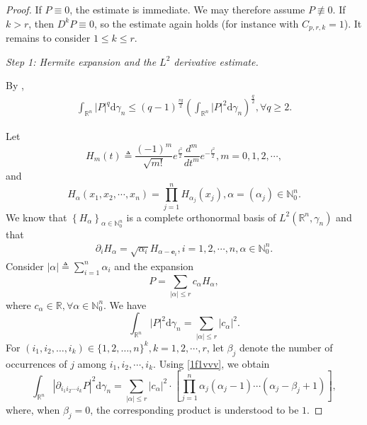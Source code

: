 \documentclass[12pt]{article}
\theoremstyle{plain}
\theoremstyle{definition}
\theoremstyle{remark}
\numberwithin{equation}{section}
\begin{document}
\begin{proof}
If $P\equiv0$, the estimate is immediate.  We may therefore assume $P\not\equiv0$.  If $k>r$, then $D^kP\equiv0$, so the estimate again holds (for instance with $C_{p,r,k}=1$).  It remains to consider $1\leqslant k\leqslant r$.

\medskip\noindent\textit{Step 1: Hermite expansion and the $L^2$ derivative estimate.}

By \cite[Proposition~5.48, p.~135]{AS17},
\begin{eqnarray}
	\int_{\mathbb{R}^{n}} \left| P \right|^{q} \mathrm{d} \gamma_{n} \leqslant \left( q-1 \right)^{\frac{rq}{2}} \left( \int_{\mathbb{R}^{n}} \left| P \right|^{2} \mathrm{d} \gamma_{n} \right)^{\frac{q}{2}},\forall q\geqslant 2.\label{13f1f3}
\end{eqnarray}
	
	Let
	$$H_{m}\left( t \right) \triangleq \frac{\left( -1 \right)^{m}}{\sqrt{m!}} e^{\frac{t^{2}}{2}}\frac{d^{m}}{dt^{m}} e^{-\frac{t^{2}}{2}},m=0,1,2,\cdots,$$
	and
	$$H_{\alpha}\left( x_{1},x_{2},\cdots ,x_{n} \right) =\prod_{j=1}^{n} H_{\alpha_{j}}\left( x_{j} \right) ,\alpha = \left( \alpha_{j} \right) \in \mathbb{N}_{0}^{n}.$$
	We know that $\left\{ H_{\alpha} \right\}_{\alpha \in \mathbb{N}_{0}^{n}}$ is a complete orthonormal basis of $L^{2}\left( \mathbb{R}^{n} ,\gamma_{n} \right)$ and that
	\begin{eqnarray}
		\partial_{i} H_{\alpha}=\sqrt{\alpha_{i}} H_{\alpha -\textbf{e}_{i}},i=1,2,\cdots ,n,\alpha \in \mathbb{N}_{0}^{n}.\label{1f1vvv}
	\end{eqnarray}
	Consider $\left| \alpha \right| \triangleq \sum\limits_{i=1}^{n} \alpha_{i}$ and the expansion
	$$P=\sum_{\left| \alpha \right| \leqslant r} c_{\alpha}H_{\alpha},$$
	where $c_{\alpha}\in \mathbb{R} ,\forall \alpha \in \mathbb{N}_{0}^{n}$. We have
	$$\int_{\mathbb{R}^{n}} \left| P \right|^{2} \mathrm{d} \gamma_{n} =\sum_{\left| \alpha \right| \leqslant r} \left| c_{\alpha} \right|^{2}.$$
	For $(i_1,i_2,\ldots,i_k)\in\{1,2,\ldots,n\}^k,k=1,2,\cdots,r$, let $\beta_{j}$ denote the number of occurrences of $j$ among $i_{1},i_{2},\cdots ,i_{k}$. Using \eqref{1f1vvv}, we obtain
	$$\int_{\mathbb{R}^{n}} \left| \partial_{i_{1}i_{2}\cdots i_{k}} P \right|^{2} \mathrm{d} \gamma_{n} =\sum_{\left| \alpha \right| \leqslant r} \left| c_{\alpha} \right|^{2} \cdot \left[ \prod_{j=1}^{n} \alpha_{j} \left( \alpha_{j} -1 \right) \cdots \left( \alpha_{j} -\beta_{j} +1 \right) \right],$$
	where, when $\beta_{j} =0$, the corresponding product is understood to be $1$. 
	

\end{proof}
\end{document}
